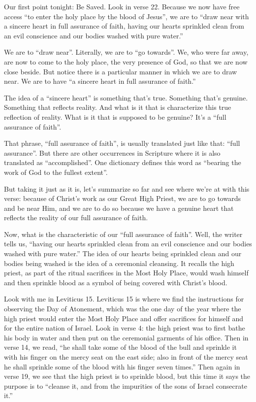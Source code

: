 \documentclass[letterpaper, 12pt]{article}
\begin{document}
    Our first point tonight: Be Saved. Look in verse 22. Because we now
    have free access ``to enter the holy place by the blood of Jesus'',
    we are to ``draw near with a sincere heart in full assurance of
    faith, having our hearts sprinkled clean from an evil conscience and
    our bodies washed with pure water.''

    We are to ``draw near''. Literally, we are to ``go towards''. We,
    who were far away, are now to come to the holy place, the very
    presence of God, so that we are now close beside. But notice there
    is a particular manner in which we are to draw near. We are to have
    ``a sincere heart in full assurance of faith.'' 

    The idea of a ``sincere heart'' is something that's true.
    Something that's genuine. Something that reflects reality. And what
    is it that is characterize this true reflection of reality. What is
    it that is supposed to be genuine? It's a ``full assurance of
    faith''. 

    That phrase, ``full assurance of faith'', is usually translated just
    like that: ``full assurance''. But there are other occurrences in
    Scripture where it is also translated as ``accomplished''. One
    dictionary defines this word as ``bearing the work of God to the
    fullest extent''.

    But taking it just as it is, let's summarize so far and see where
    we're at with this verse: because of Christ's work as our Great High
    Priest, we are to go towards and be near Him, and we are to do so
    because we have a genuine heart that reflects the reality of our
    full assurance of faith.

    Now, what is the characteristic of our ``full assurance of faith''.
    Well, the writer tells us, ``having our hearts sprinkled clean from
    an evil conscience and our bodies washed with pure water.'' The idea
    of our hearts being sprinkled clean and our bodies being washed is
    the idea of a ceremonial cleansing. It recalls the high priest, as
    part of the ritual sacrifices in the Most Holy Place, would wash
    himself and then sprinkle blood as a symbol of being covered with
    Christ's blood. 

    Look with me in Leviticus 15. Leviticus 15 is where we find the
    instructions for observing the Day of Atonement, which was the one
    day of the year where the high priest would enter the Most Holy
    Place and offer sacrifices for himself and for the entire nation of
    Israel. Look in verse 4: the high priest was to first bathe his body
    in water and then put on the ceremonial garments of his office. Then
    in verse 14, we read, ``he shall take some of the blood of the bull
    and sprinkle it with his finger on the mercy seat on the east side;
    also in front of the mercy seat he shall sprinkle some of the blood
    with his finger seven times.'' Then again in verse 19, we see that
    the high priest is to sprinkle blood, but this time it says the
    purpose is to ``cleanse it, and from the impurities of the sons of
    Israel consecrate it.''
\end{document}
